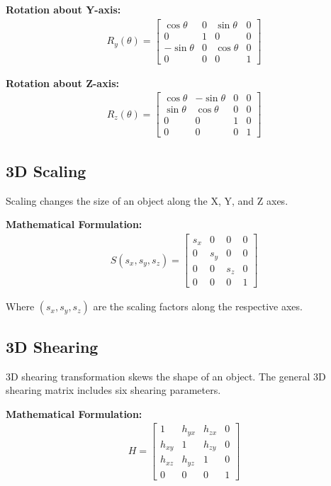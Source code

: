 \documentclass[12pt,a4paper]{article}
\begin{document}
\textbf{Rotation about Y-axis:}
\begin{align}
R_y(\theta) = \begin{bmatrix}
\cos\theta & 0 & \sin\theta & 0 \\
0 & 1 & 0 & 0 \\
-\sin\theta & 0 & \cos\theta & 0 \\
0 & 0 & 0 & 1
\end{bmatrix}
\end{align}

\textbf{Rotation about Z-axis:}
\begin{align}
R_z(\theta) = \begin{bmatrix}
\cos\theta & -\sin\theta & 0 & 0 \\
\sin\theta & \cos\theta & 0 & 0 \\
0 & 0 & 1 & 0 \\
0 & 0 & 0 & 1
\end{bmatrix}
\end{align}

\subsection{3D Scaling}
Scaling changes the size of an object along the X, Y, and Z axes.

\textbf{Mathematical Formulation:}
\begin{align}
S(s_x, s_y, s_z) = \begin{bmatrix}
s_x & 0 & 0 & 0 \\
0 & s_y & 0 & 0 \\
0 & 0 & s_z & 0 \\
0 & 0 & 0 & 1
\end{bmatrix}
\end{align}

Where $(s_x, s_y, s_z)$ are the scaling factors along the respective axes.

\subsection{3D Shearing}
3D shearing transformation skews the shape of an object. The general 3D shearing matrix includes six shearing parameters.

\textbf{Mathematical Formulation:}
\begin{align}
H = \begin{bmatrix}
1 & h_{yx} & h_{zx} & 0 \\
h_{xy} & 1 & h_{zy} & 0 \\
h_{xz} & h_{yz} & 1 & 0 \\
0 & 0 & 0 & 1
\end{bmatrix}
\end{align}
\end{document}
